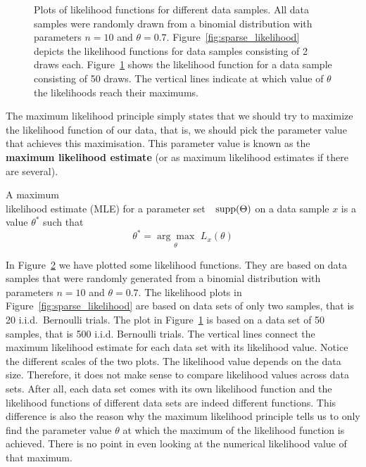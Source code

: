 \begin{figure}
\begin{subfigure}{\textwidth}
\caption{}
\label{fig:dense_likelihood} 
\end{subfigure}
\caption{Plots of likelihood functions for different data samples. All data samples were randomly drawn
from a binomial distribution with parameters $ n=10 $ and $ \theta=0.7 $.  Figure~\ref{fig:sparse_likelihood}
depicts the likelihood functions for data samples consisting of 2 draws each. 
Figure~\ref{fig:dense_likelihood}
shows the likelihood function for a data sample consisting of 50 draws. The vertical lines indicate
at which value of $ \theta $ the likelihoods reach their maximums.}
\label{fig:likelihood_plots}
\end{figure}

The maximum likelihood principle simply states that we should try to maximize the likelihood function of
our data, that is, we should pick the parameter value that achieves this maximisation. This parameter value
is known as the \textbf{maximum likelihood estimate} (or as maximum likelihood estimates if there are several). 

\begin{Definition}
A maximum \\ likelihood estimate (MLE) for a parameter set~~$ \operatorname{supp}(\Theta) $ on a data sample $ x $ 
is a value $ \theta^{*} $ such that
$$ \theta^{*} = \underset{\theta}{\arg\max}\, \, L_{x}(\theta) $$
\end{Definition}

In Figure~\ref{fig:likelihood_plots} we have plotted some likelihood functions. They are based on data
samples that were randomly generated from a binomial distribution with parameters $ n=10 $ and 
$ \theta=0.7 $. The likelihood plots in Figure~\ref{fig:sparse_likelihood} are based on data sets of only
two samples, that is 20 i.i.d.\ Bernoulli trials. The plot in Figure~\ref{fig:dense_likelihood} is based on a 
data set of 50 samples, that is 500 i.i.d. Bernoulli trials. 
The vertical lines connect the maximum likelihood estimate
for each data set with its likelihood value. Notice the different scales of the two plots. The likelihood value depends on the
data size. Therefore, it does not make sense to compare likelihood values across data sets. After all, each data set comes with its own
likelihood function and the likelihood functions of different data sets are indeed different functions. This difference is also the
reason why the maximum likelihood principle tells us to only find the parameter value $ \theta $ at which the maximum of the
likelihood function is achieved. There is no point in even looking at the numerical likelihood value of that maximum.

